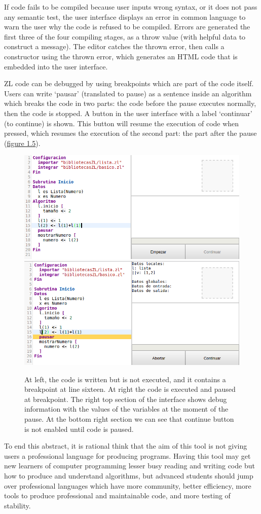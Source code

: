 \documentclass{report}
\begin{document}
	If code fails to be compiled because user inputs wrong syntax, or it does not pass any semantic test, the user interface displays an error in common language to warn the user why the code is refused to be compiled. Errors are generated the first three of the four compiling stages, as a throw value (with helpful data to construct a message). The editor catches the thrown error, then calls a constructor using the thrown error, which generates an HTML code that is embedded into the user interface. 
	
	ZL code can be debugged by using breakpoints which are part of the code itself. Users can write `pausar' (translated to pause) as a sentence inside an algorithm  which breaks the code in two parts: the code before the pause executes normally, then the code is stopped. A button in the user interface with a label `continuar' (to continue) is shown. This button will resume the execution of code when pressed, which resumes the execution of the second part: the part after the pause (\hyperref[fig:pausa]{figure 1.5}).  
	
\begin{figure}
\centering
\includegraphics[width=0.48\linewidth]{pausa1}
\includegraphics[width=0.48\linewidth]{pausa2}
\caption[Breakpoint: pause example.]{At left, the code is written but is not executed, and it contains a breakpoint at line sixteen. At right the code is executed and paused at breakpoint. The right top section of the interface shows debug information with the values of the variables at the moment of the pause. At the bottom right section we can see that continue button is not enabled until code is paused.}
\label{fig:pausa}
\end{figure}

	To end this abstract, it is rational think that the aim of this tool is not giving users a professional language for producing programs. Having this tool may get new learners of computer programming lesser busy reading and writing code but how to produce and understand algorithms, but advanced students should jump over professional languages which have more community, better efficiency, more tools to produce professional and maintainable code, and more testing of stability. 
\end{document}
